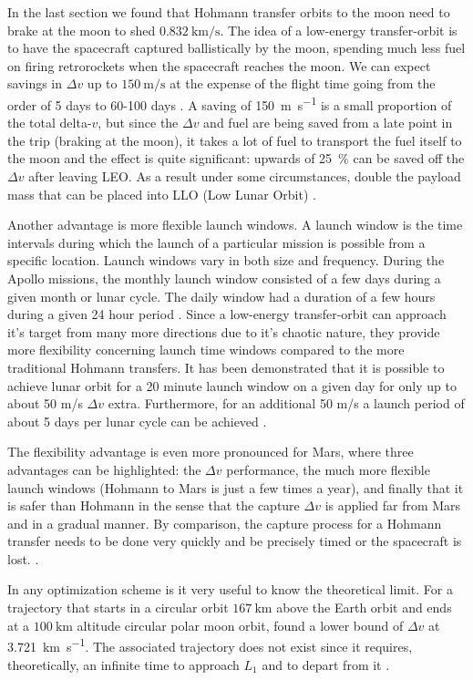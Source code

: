 In the last section we found that Hohmann transfer orbits to the moon need to brake at the moon to shed $\SI{0.832}{\km\per\s}$. The idea of a low-energy transfer-orbit is to have the spacecraft captured ballistically by the moon, spending much less fuel on firing retrorockets when the spacecraft reaches the moon. We can expect savings in $\Delta v$ up to $\SI{150}{\m\per\s}$ at the expense of the flight time going from the order of 5 days to 60-100 days \cite{Garcia2007}. A saving of \SI{150}{\m\per\s} is a small proportion of the total delta-$v$, but since the $\Delta v$ and fuel are being saved from a late point in the trip (braking at the moon), it takes a lot of fuel to transport the fuel itself to the moon and the effect is quite significant: upwards of \SI{25}{\percent} can be saved off the $\Delta v$ after leaving LEO. As a result under some circumstances, double the payload mass that can be placed into LLO (Low Lunar Orbit) \cite{Belbruno2000}.

Another advantage is more flexible launch windows. A launch window is the time intervals during which the launch of a particular mission is possible from a specific location. Launch windows vary in both size and frequency. During the Apollo missions, the monthly launch window consisted of a few days during a given month or lunar cycle. The daily window had a duration of a few hours during a given 24 hour period \cite{nasa-apollo-launch-window}. Since a low-energy transfer-orbit can approach it's target from many more directions due to it's chaotic nature, they provide more flexibility concerning launch time windows compared to the more traditional Hohmann transfers. It has been demonstrated that it is possible to achieve lunar orbit for a 20 minute launch window on a given day for only up to about 50 m/s $\Delta v$ extra. Furthermore, for an additional 50 m/s a launch period of about 5 days per lunar cycle can be achieved \cite{Belbruno2000}.

The flexibility advantage is even more pronounced for Mars, where three advantages can be highlighted: the $\Delta v$ performance, the much more flexible launch windows (Hohmann to Mars is just a few times a year), and finally that it is safer than Hohmann in the sense that the capture $\Delta v$ is applied far from Mars and in a gradual manner.  By comparison, the capture process for a Hohmann transfer needs to be done very quickly and be precisely timed or the spacecraft is lost. \cite{Topputo2014}.

In any optimization scheme is it very useful to know the theoretical limit. For a trajectory that starts in a circular orbit $\SI{167}{\km}$ above the Earth orbit and ends at a $\SI{100}{\km}$ altitude circular polar moon orbit, \cite{Sweetser1991} found a lower bound of $\Delta v$ at \SI{3.721}{\km\per\s}. The associated trajectory does not exist since it requires, theoretically, an infinite time to approach $L_1$ and to depart from it \cite{Topputo2005}.

